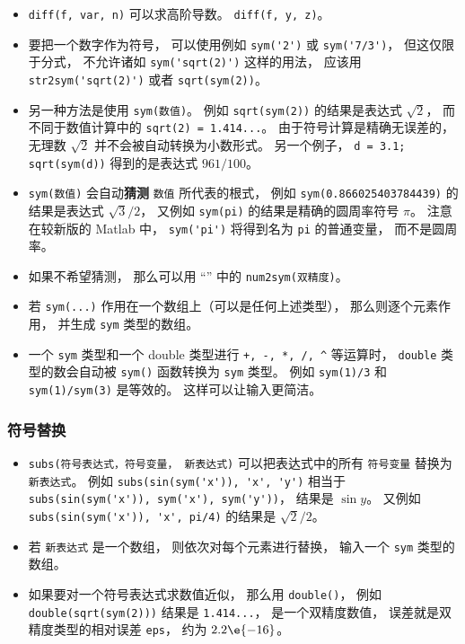 \begin{itemize}
\item \verb`diff(f, var, n)` 可以求高阶导数。 \verb`diff(f, y, z)`。

\item  要把一个数字作为符号， 可以使用例如 \verb`sym('2')` 或 \verb`sym('7/3')`， 但这仅限于分式， 不允许诸如 \verb`sym('sqrt(2)')` 这样的用法， 应该用 \verb`str2sym('sqrt(2)')` 或者 \verb`sqrt(sym(2))`。

\item 另一种方法是使用 \verb`sym(数值)`。 例如 \verb`sqrt(sym(2))` 的结果是表达式 $\sqrt 2$， 而不同于数值计算中的 \verb`sqrt(2) = 1.414...`。 由于符号计算是精确无误差的， 无理数 $\sqrt{2}$ 并不会被自动转换为小数形式。 另一个例子， \verb`d = 3.1; sqrt(sym(d))` 得到的是表达式 $961/100$。

\item  \verb`sym(数值)` 会自动\textbf{猜测} \verb`数值` 所代表的根式， 例如 \verb`sym(0.866025403784439)` 的结果是表达式 $\sqrt{3}/2$， 又例如 \verb`sym(pi)` 的结果是精确的圆周率符号 $\pi$。 注意在较新版的 Matlab 中， \verb`sym('pi')` 将得到名为 \verb`pi` 的普通变量， 而不是圆周率。

\item 如果不希望猜测， 那么可以用 “” 中的 \verb`num2sym(双精度)`。

\item 若 \verb`sym(...)` 作用在一个数组上（可以是任何上述类型）， 那么则逐个元素作用， 并生成 \verb`sym` 类型的数组。

\item 一个 \verb`sym` 类型和一个 double 类型进行 \verb`+, -, *, /, ^` 等运算时， \verb`double` 类型的数会自动被 \verb`sym()` 函数转换为 \verb`sym` 类型。 例如 \verb`sym(1)/3` 和 \verb`sym(1)/sym(3)` 是等效的。 这样可以让输入更简洁。
\end{itemize}

\subsubsection{符号替换}
\begin{itemize}
\item \verb`subs(符号表达式，符号变量， 新表达式)` 可以把表达式中的所有 \verb`符号变量` 替换为 \verb`新表达式`。 例如 \verb`subs(sin(sym('x')), 'x', 'y')` 相当于 \verb`subs(sin(sym('x')), sym('x'), sym('y'))`， 结果是 $\sin y$。 又例如 \verb`subs(sin(sym('x')), 'x', pi/4)` 的结果是 $\sqrt 2/2$。
\item 若 \verb`新表达式` 是一个数组， 则依次对每个元素进行替换， 输入一个 \verb`sym` 类型的数组。
\item 如果要对一个符号表达式求数值近似， 那么用 \verb`double()`， 例如 \verb`double(sqrt(sym(2)))` 结果是 \verb`1.414...`， 是一个双精度数值， 误差就是双精度类型的相对误差 \verb`eps`， 约为 $2.2\e{-16}$。
\end{itemize}

